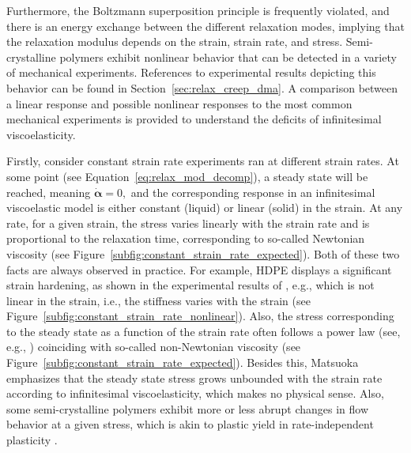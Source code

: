 Furthermore, the Boltzmann superposition principle is frequently violated, and there is an energy exchange between the different relaxation modes, implying that the relaxation modulus depends on the strain, strain rate, and stress.
Semi-crystalline polymers exhibit nonlinear behavior that can be detected in a variety of mechanical experiments.
References to experimental results depicting this behavior can be found in Section~\ref{sec:relax_creep_dma}.
A comparison between a linear response and possible nonlinear responses to the most common mechanical experiments is provided to understand the deficits of infinitesimal viscoelasticity.

Firstly, consider constant strain rate experiments ran at different strain rates.
At some point (see Equation~\eqref{eq:relax_mod_decomp}), a steady state will be reached, meaning $\dot {\bm\alpha} = 0,$ and the corresponding response in an infinitesimal viscoelastic model is either constant (liquid) or linear (solid) in the strain.
At any rate, for a given strain, the stress varies linearly with the strain rate and is proportional to the relaxation time, corresponding to so-called Newtonian viscosity \citep{matsuokaThermodynamicTheoryViscoelasticity1996} (see Figure~\ref{subfig:constant_strain_rate_expected}).
Both of these two facts are always observed in practice.
For example, HDPE displays a significant strain hardening, as shown in the experimental results of \cite{gsellYieldTransientEffects1981}, e.g., which is not linear in the strain, i.e., the stiffness varies with the strain (see Figure~\ref{subfig:constant_strain_rate_nonlinear}).
Also, the stress corresponding to the steady state as a function of the strain rate often follows a power law (see, e.g.,  \cite{gsellDeterminationPlasticBehaviour1979}) coinciding with so-called non-Newtonian viscosity (see Figure~\ref{subfig:constant_strain_rate_expected}).
Besides this, Matsuoka \citep{matsuokaThermodynamicTheoryViscoelasticity1996} emphasizes that the steady state stress grows unbounded with the strain rate according to infinitesimal viscoelasticity, which makes no physical sense.
Also, some semi-crystalline polymers exhibit more or less abrupt changes in flow behavior at a given stress, which is akin to plastic yield in rate-independent plasticity \citep{bergstromMechanicsSolidPolymers2015}.
